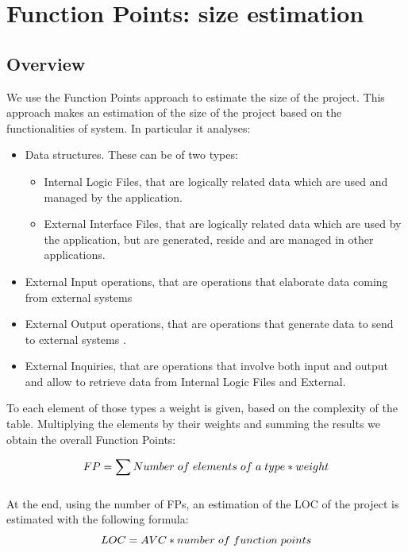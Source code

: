 \section{Function Points: size estimation}
\subsection{Overview}
We use the Function Points approach to estimate the size of the project. This approach makes an estimation of the size of the project based on the functionalities of system. In particular it analyses:
\begin{itemize}
\item Data structures. These can be of two types:
	\begin{itemize}[label={-}]
	\item Internal Logic Files, that are logically related data which are used and managed by the application.
	\item External Interface Files, that are logically related data which are used by the application, but are generated, reside and are managed in other applications.
	\end{itemize}
\item External Input operations, that are operations that elaborate data coming from external systems
\item External Output operations, that are operations that generate data to send to external systems .
\item External Inquiries, that are operations that involve both input and output and allow to retrieve data from Internal Logic Files and External.
\end{itemize} 
To each element of those types a weight is given, based on the complexity of the table.\newline
Multiplying the elements by their weights and summing the results we obtain the overall Function Points:\newline

\begin{equation}
FP = \sum_{}{}{Number\hspace{0.1 cm} of\hspace{0.1 cm} elements\hspace{0.1 cm} of\hspace{0.1 cm} a\hspace{0.1 cm} type * weight} 
\end{equation}

At the end, using the number of FPs, an estimation of the LOC of the project is estimated with the following formula:
\begin{equation}
LOC = AVC * number\hspace{0.1 cm} of\hspace{0.1 cm} function\hspace{0.1 cm} points
\end{equation}

